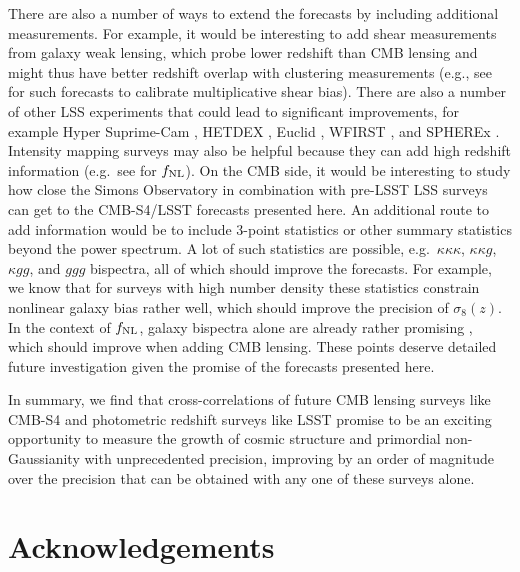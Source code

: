 \documentclass[prd,superscriptaddress,floatfix,notitlepage,nofootinbib,reprint]{revtex4-1} %
\begin{document}
There are also a number of ways to extend the forecasts by including additional measurements.
For example, it would be interesting to add shear measurements from galaxy weak lensing, which probe lower redshift than CMB lensing and might thus have better redshift overlap with clustering measurements (e.g., see  \cite{schaan1607} for such forecasts to calibrate multiplicative shear bias).
There are also a number of other LSS experiments that could lead to significant improvements, for example Hyper Suprime-Cam \cite{HSCwebsite}, HETDEX \cite{hetdexWebsite}, Euclid \cite{EuclidWhitePaper,euclidECWebsite,euclidESAWebsite}, WFIRST \cite{WFIRSTCDT,WFIRSTweb1,WFIRSTweb2}, and SPHEREx \cite{Spherex1412,spherexWebsite}.
Intensity mapping surveys may also be helpful because they can add high redshift information (e.g.~see \cite{Fonseca:2016xvi} for ${f_\mathrm{NL}}$).
On the CMB side, it would be interesting to study how close the Simons Observatory \cite{SimonsObservatory} in combination with pre-LSST LSS surveys can get to the CMB-S4/LSST forecasts presented here.
An additional route to add information would be to include 3-point statistics or other summary statistics beyond the power spectrum.
A lot of such statistics are possible, e.g.~$\kappa\kappa\kappa$, $\kappa\kappa g$, $\kappa gg$, and $ggg$ bispectra, all of which should improve the forecasts.
For example, we know that for surveys with high number density these statistics constrain nonlinear galaxy bias rather well, which should improve the precision of $\sigma_8(z)$.
In the context of ${f_\mathrm{NL}}$, galaxy bispectra alone are already rather promising \cite{Spherex1412,Yamauchi1611}, which should improve when adding CMB lensing.
These points deserve detailed future investigation given the promise of the forecasts presented here.

In summary, we find that cross-correlations of future CMB lensing surveys like CMB-S4 and photometric redshift surveys like LSST promise to be an exciting opportunity to measure the growth of cosmic structure and primordial non-Gaussianity with unprecedented precision, improving by an order of magnitude over the precision that can be obtained with any one of these surveys alone.



\section*{Acknowledgements}
\end{document}
